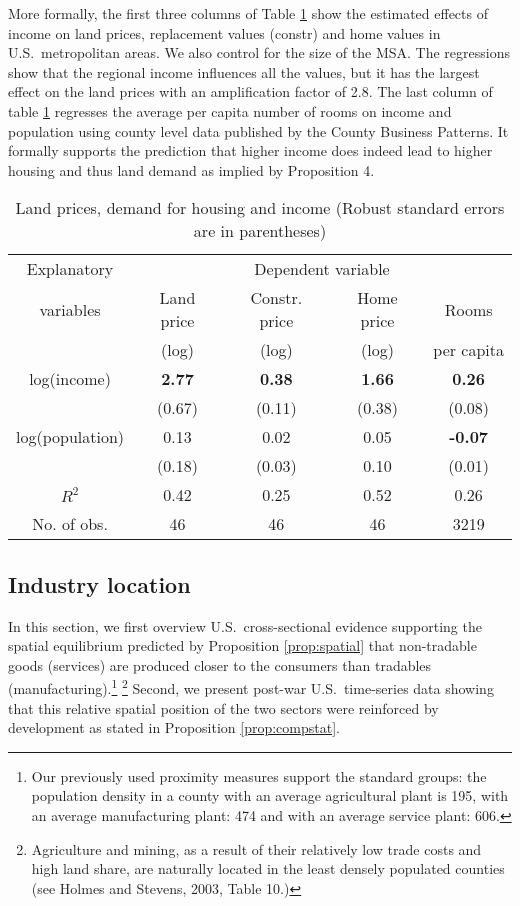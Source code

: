 \documentclass[12pt]{article}
\begin{document}
More formally, the first three columns of Table \ref{tab:land} show the estimated effects of income on land prices,  replacement values (constr) and home values in U.S.~metropolitan areas. We also control for the size of the MSA. The regressions show that the regional income influences all the values, but it has the largest effect on the land prices with an amplification factor of 2.8. The last column of table \ref{tab:land} regresses the average per capita number of rooms on income and population using county level data published by the County Business Patterns. It formally supports the prediction that higher income does indeed lead to higher housing and thus land demand as implied by Proposition 4.

\begin{table}[h!]
\center \caption{Land prices, demand for housing and income (Robust standard errors are in parentheses)} \label{tab:land}
\begin{tabular}{c|ccc|c}
  \hline\hline
  Explanatory    & \multicolumn{4}{c}{Dependent variable} \\
  variables      & Land price  & Constr. price & Home price&Rooms\\
                 &  (log)      &    (log)      & (log)     & per capita \\ \hline
  log(income)    & \textbf{2.77}   & \textbf{0.38}  & \textbf{1.66} & \textbf{0.26}\\
                 & (0.67)          & (0.11)         &  (0.38) & (0.08)\\
  log(population)& 0.13            &  0.02          &  0.05   & \textbf{-0.07}\\
                 & (0.18)          & (0.03)         &  0.10   & (0.01)\\
\hline
  $R^2$          & 0.42            & 0.25           &   0.52  & 0.26\\
  No. of obs.    & 46              & 46             &   46    & 3219 \\ \hline\hline
\end{tabular}
\end{table}

\subsection{Industry location}
In this section, we first overview U.S.~cross-sectional evidence supporting the spatial equilibrium predicted by Proposition \ref{prop:spatial} that non-tradable goods (services) are produced closer to the consumers than tradables (manufacturing).\footnote{Our previously used proximity measures support the standard groups: the population density in a county with an average agricultural plant is 195, with an average manufacturing plant: 474 and with an average service plant: 606.} \footnote{Agriculture and mining, as a result of their relatively low trade costs and high land share, are naturally located in the least densely populated counties (see Holmes and Stevens, 2003, Table 10.)} Second, we present post-war U.S.~time-series data showing that this relative spatial position of the two sectors were reinforced by development as stated in Proposition \ref{prop:compstat}.
\end{document}
